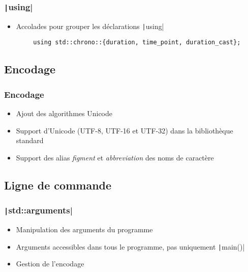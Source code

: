 \documentclass[C++.tex]{subfiles}
\begin{document}
\begin{frame}[fragile]
	\frametitle{\texttt|using|}
	\begin{itemize}
		\item Accolades pour grouper les déclarations  \texttt|using|
	\end{itemize}

	\begin{verbatim}
		using std::chrono::{duration, time_point, duration_cast};
	\end{verbatim}

\end{frame}


\subsection*{Encodage}
\begin{frame}[fragile]
	\frametitle{Encodage}
	\begin{itemize}
		\item Ajout des algorithmes Unicode


		\item Support d'Unicode (UTF-8, UTF-16 et UTF-32) dans la bibliothèque standard
		\item Support des alias \textit{figment} et \textit{abbreviation} des noms de caractère
	\end{itemize}

\end{frame}

\subsection*{Ligne de commande}
\begin{frame}[fragile]
	\frametitle{\texttt|std::arguments|}
	\begin{itemize}
		\item Manipulation des arguments du programme
		\item Arguments accessibles dans tous le programme, pas uniquement \texttt|main()|
		\item Gestion de l'encodage
	\end{itemize}

\end{frame}
\end{document}
